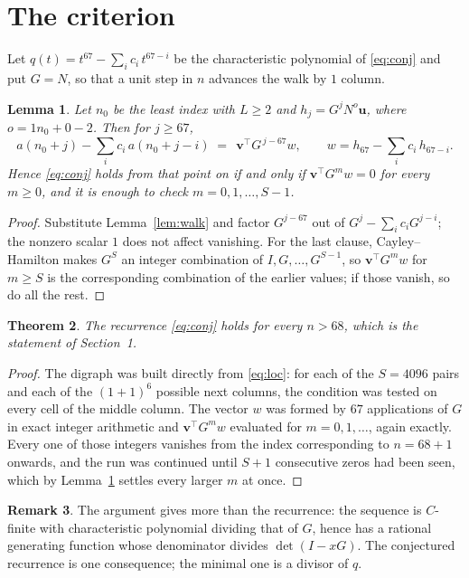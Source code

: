 \documentclass[11pt,a4paper]{article}
\theoremstyle{plain}
\newtheorem{theorem}{Theorem}
\newtheorem{lemma}[theorem]{Lemma}
\theoremstyle{definition}
\newtheorem{remark}[theorem]{Remark}
\begin{document}
\section{The criterion}

Let $q(t)=t^{67}-\sum_i c_i\,t^{67-i}$ be the characteristic polynomial of
\eqref{eq:conj} and put $G=N$, so that a unit step in $n$ advances the walk by
$1$ column.

\begin{lemma}\label{lem:crit}
Let $n_0$ be the least index with $L\ge2$ and $h_j=G^{j}N^{o}\mathbf{u}$, where
$o=1n_0+0-2$. Then for $j\ge67$,
\[
a(n_0+j)-\sum_i c_i\,a(n_0+j-i)\;=\;\,\mathbf{v}^{\!\top}G^{\,j-67}w,
\qquad w=h_{67}-\sum_i c_i\,h_{67-i} .
\]
Hence \eqref{eq:conj} holds from that point on if and only if
$\mathbf{v}^{\!\top}G^{m}w=0$ for every $m\ge0$, and it is enough to check
$m=0,1,\dots,S-1$.
\end{lemma}

\begin{proof}
Substitute Lemma~\ref{lem:walk} and factor $G^{j-67}$ out of
$G^{j}-\sum_ic_iG^{j-i}$; the nonzero scalar $1$ does not affect
vanishing. For the last clause, Cayley--Hamilton makes $G^{S}$ an integer combination of
$I,G,\dots,G^{S-1}$, so $\mathbf{v}^{\!\top}G^{m}w$ for $m\ge S$ is the corresponding
combination of the earlier values; if those vanish, so do all the rest.
\end{proof}

\begin{theorem}
The recurrence \eqref{eq:conj} holds for every $n>68$, which is the statement of
Section~1.
\end{theorem}

\begin{proof}
The digraph was built directly from \eqref{eq:loc}: for each of the $S=4096$ pairs and each
of the $(1+1)^{6}$ possible next columns, the condition was tested on every cell of
the middle column. The vector $w$ was formed by $67$ applications of $G$ in exact integer
arithmetic and $\mathbf{v}^{\!\top}G^{m}w$ evaluated for $m=0,1,\dots$, again exactly.
Every one of those integers vanishes from the index corresponding to $n=68+1$ onwards,
and the run was continued until $S+1$ consecutive zeros had been seen, which by
Lemma~\ref{lem:crit} settles every larger $m$ at once.
\end{proof}

\begin{remark}
The argument gives more than the recurrence: the sequence is $C$-finite with characteristic
polynomial dividing that of $G$, hence has a rational generating function whose denominator
divides $\det(I-xG)$. The conjectured recurrence is one consequence; the minimal one is a
divisor of $q$.
\end{remark}
\end{document}
